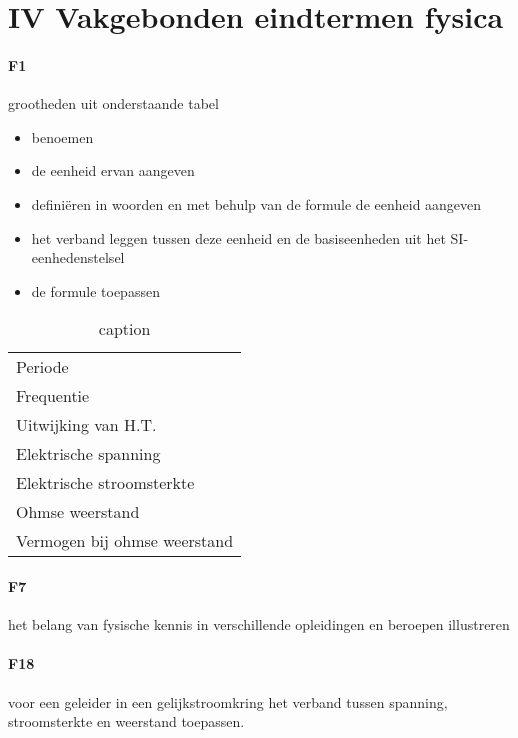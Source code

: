 \documentclass{article}
\begin{document}
	\maketitle
	\section{IV Vakgebonden eindtermen fysica}

		\paragraph*{F1} grootheden uit onderstaande tabel
			\begin{itemize}
				\item benoemen
				\item de eenheid ervan aangeven
				\item defini\"eren in woorden en met behulp van de formule de eenheid aangeven
				\item het verband leggen tussen deze eenheid en de basiseenheden uit het SI-eenhedenstelsel
				\item de formule toepassen
			\end{itemize}

			\begin{table}[h!]
			\centering
				\begin{tabular}{|l|}
				\hline
					Periode  \\ 
					Frequentie  \\
					Uitwijking van H.T.  \\
					Elektrische spanning  \\
					Elektrische stroomsterkte  \\
					Ohmse weerstand  \\
					Vermogen bij ohmse weerstand  \\
				\hline
				\end{tabular}
				\caption{caption}
				\label{tbl:label}
			\end{table}

		\paragraph*{F7} het belang van fysische kennis in verschillende opleidingen en beroepen illustreren
		\paragraph*{F18}	voor een geleider in een gelijkstroomkring het verband tussen spanning, stroomsterkte en weerstand toepassen.
\end{document}
